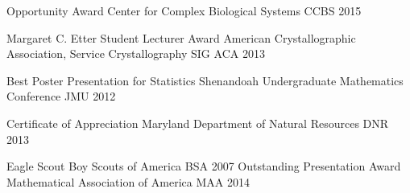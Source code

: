 

\begin{cvhonors}
\cvhonor
	{Opportunity Award} %
	{Center for Complex Biological Systems} %
	{CCBS} %
	{2015} %

  \cvhonor
    {Margaret C. Etter Student Lecturer Award} %
    {American Crystallographic Association, Service Crystallography SIG} %
    {ACA} %
    {2013} %

  \cvhonor
    {Best Poster Presentation for Statistics} %
    {Shenandoah Undergraduate Mathematics Conference} %
    {JMU} %
    {2012} %

\end{cvhonors}



\begin{cvhonors}
\cvhonor
	{Certificate of Appreciation} %
	{Maryland Department of Natural Resources} %
	{DNR} %
	{2013} %

\cvhonor
	{Eagle Scout} %
	{Boy Scouts of America} %
	{BSA} %
	{2007} %
  \cvhonor
  {Outstanding Presentation Award} %
  {Mathematical Association of America} %
  {MAA} %
  {2014} %
  
\end{cvhonors}